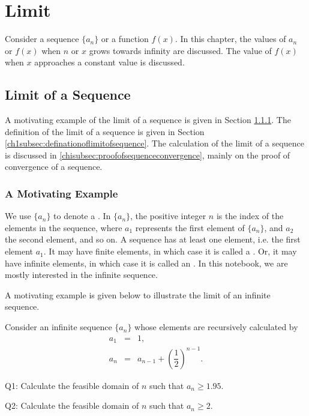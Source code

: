 \chapter{Limit} \label{ch1title}

Consider a sequence $\{a_n\}$ or a function $f(x)$. In this chapter, the values of $a_n$ or $f(x)$ when $n$ or $x$ grows towards infinity are discussed. The value of $f(x)$ when $x$ approaches a constant value is discussed.

\section{Limit of a Sequence} \label{ch1sec:limitofsequence}

A motivating example of the limit of a sequence is given in Section \ref{ch1subsec:sequencemotivatingexample}. The definition of the limit of a sequence is given in Section \ref{ch1subsec:definationoflimitofsequence}. The calculation of the limit of a sequence is discussed in \ref{chisubsec:proofofsequenceconvergence}, mainly on the proof of convergence of a sequence.

\subsection{A Motivating Example} \label{ch1subsec:sequencemotivatingexample}

We use $\{a_n\}$ to denote a . In $\{a_n\}$, the positive integer $n$ is the index of the elements in the sequence, where $a_1$ represents the first element of $\{a_n\}$, and $a_2$ the second element, and so on. A sequence has at least one element, i.e. the first element $a_1$. It may have finite elements, in which case it is called a . Or, it may have infinite elements, in which case it is called an . In this notebook, we are mostly interested in the infinite sequence.

A motivating example is given below to illustrate the limit of an infinite sequence.

\begin{shortbox}

Consider an infinite sequence $\{a_n\}$ whose elements are recursively calculated by
\begin{eqnarray}
  a_1 &=& 1, \label{ch1eq:motivatingexampleinitialcondition} \\
  a_n &=& a_{n-1} + \left(\dfrac{1}{2}\right)^{n-1}. \label{ch1eq:motivatingexamplerecursive}
\end{eqnarray}

Q1: Calculate the feasible domain of $n$ such that $a_n\geq 1.95$.

Q2: Calculate the feasible domain of $n$ such that $a_n\geq 2$.
\end{shortbox}

